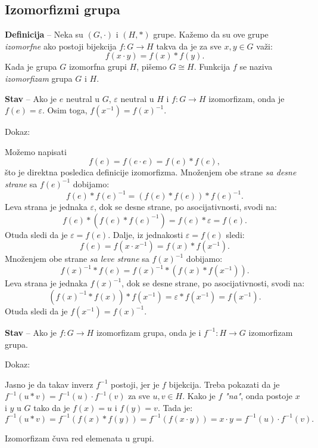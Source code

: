 \documentclass[a4paper,12pt]{article}
\newcommand{\f}[1]{\(#1\)}
\begin{document}
\subsection{Izomorfizmi grupa}

\textbf{Definicija} -- Neka su $(G, \cdot)$ i $(H, *)$ grupe. Kažemo da su ove grupe \emph{izomorfne} ako postoji bijekcija \( f : G \rightarrow H \) takva da je za sve \( x, y \in G \) važi:
\[
  f(x \cdot y) = f(x) * f(y).
\]
Kada je grupa \( G \) izomorfna grupi \( H \), pišemo \( G \cong H \). Funkcija \( f \) se naziva \emph{izomorfizam} grupa \( G \) i \( H \).

\textbf{Stav} -- Ako je \f{e} neutral u \f{G}, \f{\varepsilon} neutral u \f{H} i
\f{f:G \to H} izomorfizam, onda je \f{f(e)=\varepsilon}.
Osim toga, \f{f(x^{-1}) = f(x)^{-1}}.

Dokaz:

Možemo napisati
\[
f(e) = f(e \cdot e) = f(e) * f(e),
\]
što je direktna posledica definicije izomorfizma.
Množenjem obe strane \emph{sa desne strane} sa \f{f(e)^{-1}} dobijamo:
\[
f(e) * f(e)^{-1} = (f(e) * f(e)) * f(e)^{-1}.
\]
Leva strana je jednaka \f{\varepsilon}, dok se desne strane,
po asocijativnosti, svodi na:
\[
f(e) * (f(e) * f(e)^{-1}) = f(e) * \varepsilon = f(e).
\]
Otuda sledi da je \f{\varepsilon = f(e)}.
Dalje, iz jednakosti \f{\varepsilon = f(e)} sledi:
\[ 
f(e) = f(x \cdot x^{-1}) = f(x) * f(x^{-1}).
\]
Množenjem obe strane \emph{sa leve strane} sa \f{f(x)^{-1}} dobijamo:
\[
f(x)^{-1} * f(e) = f(x)^{-1} * (f(x) * f(x^{-1})).
\]
Leva strana je jednaka \f{f(x)^{-1}}, dok se desne strane, po asocijativnosti, svodi na:
\[
(f(x)^{-1} * f(x)) * f(x^{-1}) = \varepsilon * f(x^{-1}) = f(x^{-1}).
\]
Otuda sledi da je \f{f(x^{-1}) = f(x)^{-1}}.

\textbf{Stav} -- Ako je \f{f:G \rightarrow H} izomorfizam grupa, onda je i \f{f^{-1}:H \rightarrow G} izomorfizam grupa.

Dokaz:

Jasno je da takav inverz \f{f^{-1}} postoji, jer je \f{f} bijekcija. Treba pokazati da je \f{f^{-1}(u*v) = f^{-1}(u) \cdot f^{-1}(v)} za sve \f{u, v \in H}.
Kako je \f{f} \emph{"na"}, onda postoje \f{x} i \f{y} u \f{G} tako da je \f{f(x) = u} i \f{f(y) = v}. Tada je:
\[
f^{-1}(u*v) = f^{-1}(f(x) * f(y)) = f^{-1}(f(x \cdot y)) = x \cdot y = f^{-1}(u) \cdot f^{-1}(v).
\]


Izomorfizam čuva red elemenata u grupi.
\end{document}
